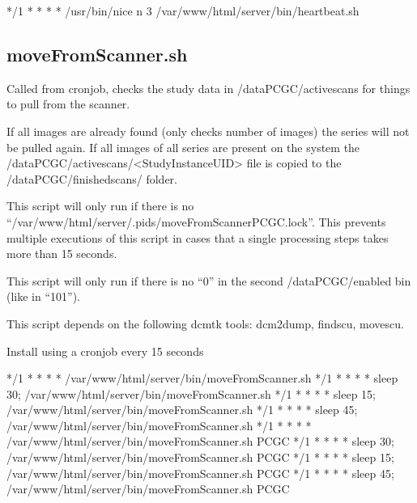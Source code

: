 \documentclass[letterpaper,10pt,english]{sphinxmanual}
\begin{document}
\begin{sphinxVerbatim}[commandchars=\\\{\}]
*/1 * * * * /usr/bin/nice \PYGZhy{}n 3 /var/www/html/server/bin/heartbeat.sh
\end{sphinxVerbatim}

\sphinxstepscope


\subsection{moveFromScanner.sh}
\label{\detokenize{Architecture/scripts/moveFromScanner:movefromscanner-sh}}\label{\detokenize{Architecture/scripts/moveFromScanner::doc}}
\sphinxAtStartPar
Called from cron\sphinxhyphen{}job, checks the study data in /dataPCGC/active\sphinxhyphen{}scans for things to pull from the scanner.

\sphinxAtStartPar
If all images are already found (only checks number of images) the series will not be pulled again.
If all images of all series are present on the system the /dataPCGC/active\sphinxhyphen{}scans/\textless{}StudyInstanceUID\textgreater{} file is copied to the /dataPCGC/finished\sphinxhyphen{}scans/ folder.

\sphinxAtStartPar
This script will only run if there is no “/var/www/html/server/.pids/moveFromScannerPCGC.lock”. This prevents multiple executions of this script in cases that a single processing steps takes more than 15 seconds.

\sphinxAtStartPar
This script will only run if there is no “0” in the second /dataPCGC/enabled bin (like in “101”).

\sphinxAtStartPar
This script depends on the following dcmtk tools: dcm2dump, findscu, movescu.

\sphinxAtStartPar
Install using a cron\sphinxhyphen{}job every 15 seconds

\begin{sphinxVerbatim}[commandchars=\\\{\}]
*/1 * * * * /var/www/html/server/bin/moveFromScanner.sh
*/1 * * * * sleep 30; /var/www/html/server/bin/moveFromScanner.sh
*/1 * * * * sleep 15; /var/www/html/server/bin/moveFromScanner.sh
*/1 * * * * sleep 45; /var/www/html/server/bin/moveFromScanner.sh
*/1 * * * * /var/www/html/server/bin/moveFromScanner.sh PCGC
*/1 * * * * sleep 30; /var/www/html/server/bin/moveFromScanner.sh PCGC
*/1 * * * * sleep 15; /var/www/html/server/bin/moveFromScanner.sh PCGC
*/1 * * * * sleep 45; /var/www/html/server/bin/moveFromScanner.sh PCGC
\end{sphinxVerbatim}
\end{document}
